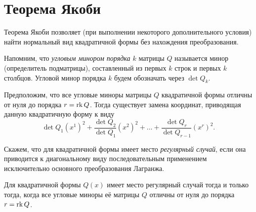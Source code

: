 \section{Теорема Якоби}

Теорема Якоби позволяет (при выполнении некоторого дополнительного условия) найти нормальный вид квадратичной формы без нахождения преобразования.

Напомним, что \textit{угловым минором порядка $k$} матрицы $Q$ называется минор (определитель подматрицы), составленный из первых $k$ строк и первых $k$ столбцов. Угловой минор порядка $k$ будем обозначать через $\det Q_k$.

\begin{theorem}[Якоби]
    Предположим, что все угловые миноры матрицы $Q$ квадратичной формы отличны от нуля до порядка $r = \operatorname{rk} Q$. Тогда существует замена координат, приводящая данную квадратичную форму к виду
    \[
        \det Q_1(x^1)^2 + \frac{\det Q_2}{\det Q_1}(x^2)^2 + \ldots + \frac{\det Q_r}{\det Q_{r - 1}}(x^r)^2.
    \]
\end{theorem}

\begin{definition}
    Скажем, что для квадратичной формы имеет место \textit{регулярный случай}, если она приводится к диагональному виду последовательным применением исключительно основного преобразования Лагранжа.
\end{definition}

\begin{lemma}
    Для квадратичной формы $Q(x)$ имеет место регулярный случай тогда и только тогда, когда все угловые миноры её матрицы $Q$ отличны от нуля до порядка $r = \operatorname{rk} Q$.
\end{lemma}

